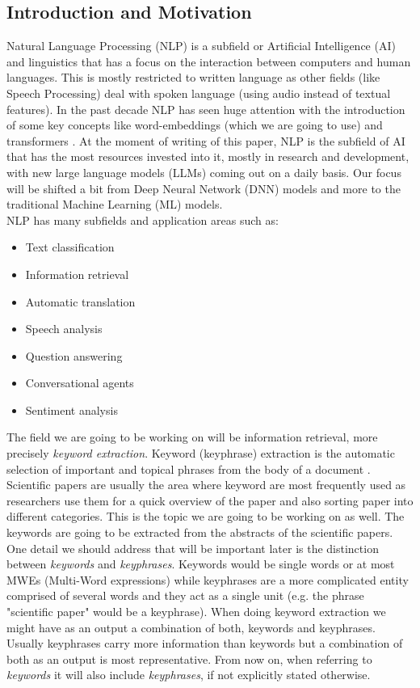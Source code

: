 \documentclass[12pt]{article}
\numberwithin{equation}{section}
\begin{document}
\begin{spacing}{1.5}
	\section{Introduction and Motivation}
	Natural Language Processing (NLP) is a subfield or Artificial Intelligence (AI) and linguistics that has a focus on the interaction between computers and human languages. This is mostly restricted to written language as other fields (like Speech Processing) deal with spoken language (using audio instead of textual features). In the past decade NLP has seen huge attention with the introduction of some key concepts like word-embeddings \cite{we} (which we are going to use) and transformers \cite{transformers}. At the moment of writing of this paper, NLP is the subfield of AI that has the most resources invested into it, mostly in research and development, with new large language models (LLMs) coming out on a daily basis. Our focus will be shifted a bit from Deep Neural Network (DNN) models and more to the traditional Machine Learning (ML) models. \\
	NLP has many subfields and application areas such as:
	\begin{itemize}
		\item Text classification
		\item Information retrieval
		\item Automatic translation
		\item Speech analysis 
		\item Question answering
		\item Conversational agents
		\item Sentiment analysis
	\end{itemize} 
	The field we are going to be working on will be information retrieval, more precisely \textit{keyword extraction}. Keyword (keyphrase) extraction is the automatic selection of important and topical phrases from the body of a document \cite{PeterTurney}. Scientific papers are usually the area where keyword are most frequently used as researchers use them for a quick overview of the paper and also sorting paper into different categories. This is the topic we are going to be working on as well. The keywords are going to be extracted from the abstracts of the scientific papers. One detail we should address that will be important later is the distinction between \textit{keywords} and \textit{keyphrases}. Keywords would be single words or at most MWEs (Multi-Word expressions) while keyphrases are a more complicated entity comprised of several words and they act as a single unit (e.g. the phrase "scientific paper" would be a keyphrase). When doing keyword extraction we might have as an output a combination of both, keywords and keyphrases. Usually keyphrases carry more information than keywords but a combination of both as an output is most representative. From now on, when referring to \textit{keywords} it will also include \textit{keyphrases}, if not explicitly stated otherwise. \\

\end{spacing}
\end{document}
